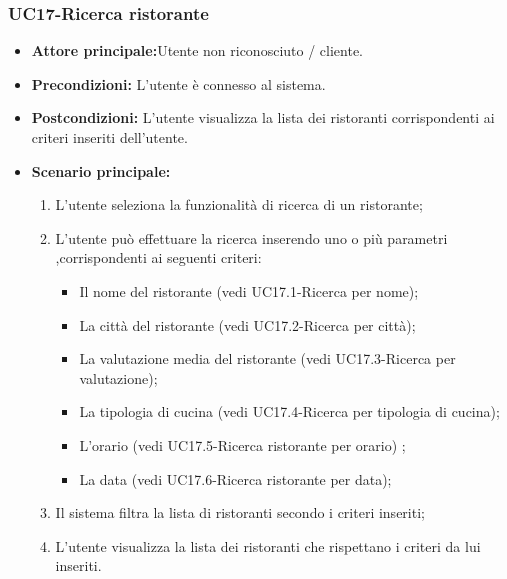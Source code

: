 \subsubsection{UC17-Ricerca ristorante}
\begin{itemize}
\item \textbf{Attore principale:}Utente non riconosciuto / cliente.
\item \textbf{Precondizioni:} L'utente è connesso al sistema.
\item \textbf{Postcondizioni:} L'utente visualizza la lista dei ristoranti corrispondenti ai criteri inseriti
dell'utente.
\item \textbf{Scenario principale:}
\begin{enumerate}
    \item L'utente seleziona la funzionalità di ricerca di un ristorante;
    \item L'utente può effettuare la ricerca inserendo uno o più parametri ,corrispondenti
    ai seguenti criteri:
    \begin{itemize}
        \item Il nome del ristorante (vedi UC17.1-Ricerca per nome);
        \item La città del ristorante (vedi UC17.2-Ricerca per città);
        \item La valutazione media del ristorante (vedi UC17.3-Ricerca per valutazione);
        \item La tipologia di cucina (vedi UC17.4-Ricerca per tipologia di cucina);
        \item L'orario (vedi UC17.5-Ricerca ristorante per orario) ;
        \item La data (vedi UC17.6-Ricerca ristorante per data);
    \end{itemize}
    \item  Il sistema filtra la lista di ristoranti secondo i criteri inseriti;
    \item L'utente visualizza la lista dei ristoranti che rispettano i criteri da lui inseriti.
\end{enumerate}
\end{itemize}

